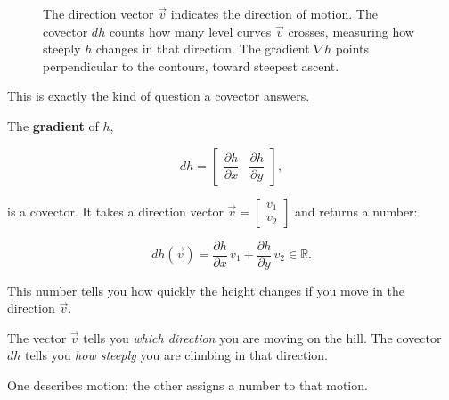\documentclass[11pt,openany]{book}
\theoremstyle{definition}
\begin{document}
\begin{figure}[h]

\caption{The direction vector $\vec{v}$ indicates the direction of motion.
The covector $dh$ counts how many level curves $\vec{v}$ crosses, measuring
how steeply $h$ changes in that direction.
The gradient $\nabla h$ points perpendicular to the contours, toward steepest ascent.}
\end{figure}

This is exactly the kind of question a covector answers.

\medskip

The \textbf{gradient} of $h$,

\[
dh = \begin{bmatrix} \dfrac{\partial h}{\partial x} & \dfrac{\partial h}{\partial y} \end{bmatrix},
\]

is a covector. It takes a direction vector $\vec{v} = \begin{bmatrix} v_1 \\ v_2 \end{bmatrix}$
and returns a number:

\[
dh(\vec{v}) = \frac{\partial h}{\partial x}\,v_1 + \frac{\partial h}{\partial y}\,v_2 \in \mathbb{R}.
\]

\medskip

This number tells you how quickly the height changes if you move in the direction $\vec{v}$.

\medskip

\begin{keyidea}
The vector $\vec{v}$ tells you \textit{which direction} you are moving
on the hill. The covector $dh$ tells you \textit{how steeply} you are climbing in that direction.
\end{keyidea}
\medskip

One describes motion; the other assigns a number to that motion.

\medskip
\end{document}
